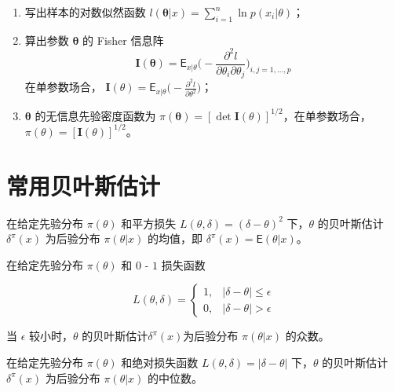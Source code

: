\documentclass[12pt,a4paper,UTF8,twoside]{book}
\providecommand{\tightlist}{%
  \setlength{\itemsep}{0pt}\setlength{\parskip}{0pt}}
\theoremstyle{definition}
\theoremstyle{definition}
\theoremstyle{definition}
\theoremstyle{remark}
\let\BeginKnitrBlock\begin \let\EndKnitrBlock\end
\begin{document}
\begin{enumerate}
\def\labelenumi{\arabic{enumi}.}
\tightlist
\item
  写出样本的对数似然函数
  \(l(\boldsymbol{\theta}|x) = \sum_{i=1}^{n}\ln p(x_i | \theta)\)；
\item
  算出参数 \(\boldsymbol{\theta}\) 的 Fisher 信息阵
  \[\mathbf{I}(\boldsymbol{\theta}) = \mathsf{E}_{x|\theta} \big( - \frac{\partial^2 l}{\partial \theta_i \partial \theta_j} \big)_{i,j=1,\ldots,p}\]
  在单参数场合，
  \(\mathbf{I}(\theta) = \mathsf{E}_{x|\theta} \big( - \frac{\partial^2 l}{\partial \theta^2} \big)\)；
\item
  \(\boldsymbol{\theta}\) 的无信息先验密度函数为
  \(\pi(\boldsymbol{\theta}) = [\det \mathbf{I}(\theta) ]^{1/2}\)，在单参数场合，
  \(\pi(\theta) = [\mathbf{I}(\theta) ]^{1/2}\)。
\end{enumerate}

\hypertarget{bayes-estimates}{%
\section{常用贝叶斯估计}\label{bayes-estimates}}

\BeginKnitrBlock{theorem}[平方损失]
\protect\hypertarget{thm:bayes-estimate-square}{}{\label{thm:bayes-estimate-square}
{} }在给定先验分布 \(\pi(\theta)\) 和平方损失
\(L(\theta,\delta) = (\delta - \theta)^2\) 下，\(\theta\) 的贝叶斯估计
\(\delta^{\pi}(x)\) 为后验分布 \(\pi(\theta|x)\) 的均值，即
\(\delta^{\pi}(x) = \mathsf{E}(\theta|x)\)。
\EndKnitrBlock{theorem}

\BeginKnitrBlock{theorem}[0 - 1 损失]
\protect\hypertarget{thm:bayes-estimate-01}{}{\label{thm:bayes-estimate-01}
{} }在给定先验分布 \(\pi(\theta)\) 和 \(0\) -
\(1\) 损失函数

\begin{equation*}
L(\theta,\delta) = 
\begin{cases}
1, & | \delta - \theta| \leq \epsilon \\
0, & | \delta - \theta| > \epsilon
\end{cases}
\end{equation*}

当 \(\epsilon\) 较小时，\(\theta\)
的贝叶斯估计\(\delta^{\pi}(x)\)为后验分布 \(\pi(\theta|x)\) 的众数。
\EndKnitrBlock{theorem}

\BeginKnitrBlock{theorem}[绝对值损失]
\protect\hypertarget{thm:bayes-estimate-abs}{}{\label{thm:bayes-estimate-abs}
{} }在给定先验分布 \(\pi(\theta)\)
和绝对损失函数 \(L(\theta,\delta) = |\delta - \theta|\) 下，\(\theta\)
的贝叶斯估计 \(\delta^{\pi}(x)\) 为后验分布 \(\pi(\theta|x)\) 的中位数。
\EndKnitrBlock{theorem}
\end{document}
